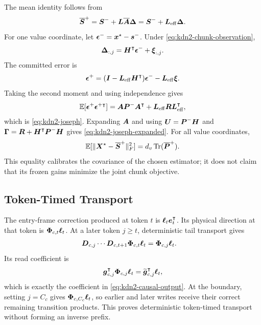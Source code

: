 \documentclass[11pt,letterpaper,logo]{yalearxiv}
\begin{document}
The mean identity follows from
\begin{equation}
  \overline{\boldsymbol{S}}^+
  =
  \boldsymbol{S}^-+\boldsymbol{L}\overline{\boldsymbol{A}}\boldsymbol{\Delta}
  =
  \boldsymbol{S}^-+\boldsymbol{L}_{\mathrm{eff}}\boldsymbol{\Delta}.
  \label{eq:app-kdn2-effective-identity}
\end{equation}
For one value coordinate, let
$\boldsymbol{\epsilon}^-=\boldsymbol{x}^\star-\boldsymbol{s}^-$. Under
\eqref{eq:kdn2-chunk-observation},
\begin{equation}
  \boldsymbol{\Delta}_{:,j}
  =
  \boldsymbol{H}^{\intercal}\boldsymbol{\epsilon}^-+\boldsymbol{\xi}_{:,j}.
  \label{eq:app-kdn2-delta-error}
\end{equation}
The committed error is
\begin{equation}
  \boldsymbol{\epsilon}^+
  =
  (\boldsymbol{I}-\boldsymbol{L}_{\mathrm{eff}}\boldsymbol{H}^{\intercal})
  \boldsymbol{\epsilon}^-
  -
  \boldsymbol{L}_{\mathrm{eff}}\boldsymbol{\xi}.
  \label{eq:app-kdn2-error-recursion}
\end{equation}
Taking the second moment and using independence gives
\begin{equation}
  \mathbb{E}[\boldsymbol{\epsilon}^+\boldsymbol{\epsilon}^{+\intercal}]
  =
  \boldsymbol{A}\boldsymbol{P}^-\boldsymbol{A}^{\intercal}
  +
  \boldsymbol{L}_{\mathrm{eff}}\boldsymbol{R}\boldsymbol{L}_{\mathrm{eff}}^{\intercal},
  \label{eq:app-kdn2-joseph}
\end{equation}
which is \eqref{eq:kdn2-joseph}. Expanding $\boldsymbol{A}$ and using
$\boldsymbol{U}=\boldsymbol{P}^-\boldsymbol{H}$ and
$\boldsymbol{\Gamma}=\boldsymbol{R}+\boldsymbol{H}^{\intercal}\boldsymbol{P}^-\boldsymbol{H}$ gives
\eqref{eq:kdn2-joseph-expanded}. For all value coordinates,
\begin{equation}
  \mathbb{E}[
    \|\boldsymbol{X}^\star-\overline{\boldsymbol{S}}^+\|_F^2
  ]
  =
  d_v\operatorname{Tr}(\overline{\boldsymbol{P}}^+).
  \label{eq:app-kdn2-frobenius-trace}
\end{equation}
This equality calibrates the covariance of the chosen estimator; it does not claim that its
frozen gains minimize the joint chunk objective.

\subsection{Token-Timed Transport}
\label{app:kdn2-transport-proof}

The entry-frame correction produced at token $t$ is
$\boldsymbol{\ell}_t\boldsymbol{e}_t^{\intercal}$. Its physical direction at that token is
$\boldsymbol{\Phi}_{c,t}\boldsymbol{\ell}_t$. At a later token $j\geq t$, deterministic tail transport gives
\begin{equation}
\begin{aligned}
  \boldsymbol{D}_{c,j}\cdots\boldsymbol{D}_{c,t+1}
  \boldsymbol{\Phi}_{c,t}\boldsymbol{\ell}_t
  &=
  \boldsymbol{\Phi}_{c,j}\boldsymbol{\ell}_t.
\end{aligned}
\label{eq:app-kdn2-tail-transport}
\end{equation}
Its read coefficient is
\begin{equation}
  \boldsymbol{g}_{c,j}^{\intercal}\boldsymbol{\Phi}_{c,j}\boldsymbol{\ell}_t
  =
  \widetilde{\boldsymbol{g}}_{c,j}^{\intercal}\boldsymbol{\ell}_t,
  \label{eq:app-kdn2-transported-read}
\end{equation}
which is exactly the coefficient in \eqref{eq:kdn2-causal-output}. At the boundary, setting
$j=C_c$ gives $\boldsymbol{\Phi}_{c,C_c}\boldsymbol{\ell}_t$, so earlier and later writes receive their correct
remaining transition products. This proves deterministic token-timed transport without forming an
inverse prefix.
\end{document}
